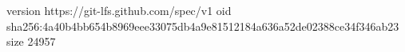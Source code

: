 version https://git-lfs.github.com/spec/v1
oid sha256:4a40b4bb654b8969eee33075db4a9e81512184a636a52de02388ce34f346ab23
size 24957
